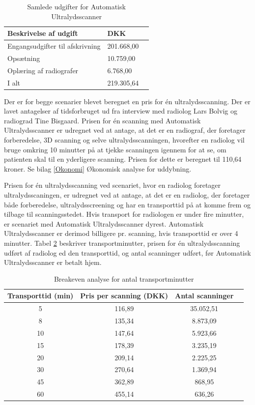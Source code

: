 \begin{table}[htb]
\centering
\begin{tabular}{ | l | l | p{} | }
\hline
\textbf{Beskrivelse af udgift} & \textbf{DKK} \\\hline
Engangsudgifter til afskrivning & 201.668,00 \\\hline
Opsætning & 10.759,00 \\\hline
Oplæring af radiografer & 6.768,00 \\\hline
I alt & 219.305,64 \\\hline
\end{tabular}
\caption{Samlede udgifter for Automatisk Ultralydsscanner}
\label{FasteOmkostninger}
\end{table}

Der er for begge scenarier blevet beregnet en pris for én ultralydsscanning. Der er lavet antagelser af tidsforbruget ud fra interview med radiolog Lars Bolvig og radiograd Tine Bisgaard. Prisen for én scanning med Automatisk Ultralydsscanner er udregnet ved at antage, at det er en radiograf, der foretager forberedelse, 3D scanning og selve ultralydsscanningen, hvorefter en radiolog vil bruge omkring 10 minutter på at tjekke scanningen igennem for at se, om patienten skal til en yderligere scanning. Prisen for dette er beregnet til 110,64 kroner. Se bilag \ref{Okonomi} Økonomisk analyse for uddybning. 

Prisen for én ultralydsscanning ved scenariet, hvor en radiolog foretager ultralydsscaningen, er udregnet ved at antage, at det er en radiolog, der foretager både forberedelse, ultralydsscreening og har en transporttid på at komme frem og tilbage til scanningsstedet. Hvis transport for radiologen er under fire minutter, er scenariet med Automatisk Ultralydsscanner dyrest. Automatisk Ultralydsscanner er derimod billigere pr. scanning, hvis transporttid er over 4 minutter. Tabel \ref{Breakeven} beskriver transportminutter, prisen for én ultralydsscanning udført af radiolog ed den transporttid, og antal scanninger udført, før Automatisk Ultralydsscanner er betalt hjem. 

\begin{table}[H]
\centering
\begin{tabular}{ | c | c | c | p{} | }
\hline
\textbf{Transporttid (min)} & \textbf{Pris per scanning (DKK)} & \textbf{Antal scanninger} \\\hline
5 & 116,89 & 35.052,51 \\\hline
8 & 135,34 & 8.873,09\\\hline
10 & 147,64 & 5.923,66\\\hline
15 & 178,39 & 3.235,19 \\\hline
20 & 209,14 & 2.225,25\\\hline
30 & 270,64 & 1.369,94\\\hline
45 & 362,89 & 868,95 \\\hline
60 & 455,14 & 636,26 \\\hline
\end{tabular}
\caption{Breakeven analyse for antal transportminutter}
\label{Breakeven}
\end{table}

